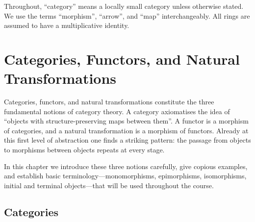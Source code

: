 \documentclass[a4paper,12pt]{book}
\theoremstyle{definition}
\theoremstyle{plain}
\theoremstyle{remark}
\begin{document}
\noindent
Throughout, ``category'' means a locally small category unless otherwise
stated.  We use the terms ``morphism'', ``arrow'', and ``map''
interchangeably.  All rings are assumed to have a multiplicative
identity.



\chapter{Categories, Functors, and Natural Transformations}
\label{ch:cat-fun-nat}
\minitoc

\vspace{1em}

Categories, functors, and natural transformations constitute the three
fundamental notions of category theory.  A category axiomatises the idea
of ``objects with structure-preserving maps between them''.  A functor is
a morphism of categories, and a natural transformation is a morphism of
functors.  Already at this first level of abstraction one finds a
striking pattern: the passage from objects to morphisms between objects
repeats at every stage.

In this chapter we introduce these three notions carefully, give
copious examples, and establish basic terminology---monomorphisms,
epimorphisms, isomorphisms, initial and terminal objects---that will be
used throughout the course.



\section{Categories}\label{sec:categories}
\end{document}
